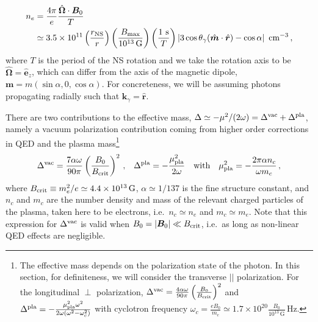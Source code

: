 \documentclass[a4paper,11pt]{article}
\begin{document}
%
\begin{equation}
    \begin{aligned}
   n_{e} & = \frac{4 \pi}{e}\frac{ \hat{\bm{\Omega}} \cdot \bm{B}_{0} }{  T} \\
   & \simeq 3.5 \times 10^{11} \left( \frac{r_{\rm NS}}{r} \right) \left( \frac{B_{\rm max}}{10^{13} \, \text{G}} \right) \left( \frac{1~\text{s}}{T} \right) \left\vert 3 \cos \theta_{\gamma} (\hat{\bm{m}} \cdot \hat{\bm{r}} ) - \cos \alpha  \right\vert~\text{cm}^{-3} \,,
    \end{aligned}
\end{equation}
%
where $ T $ is the period of the NS rotation and we take the rotation axis to be $ \hat{\bm \Omega} = \hat{\bm{e}}_{z}$, 
which can differ from the axis of the magnetic dipole, $ \bm{m} = m (\sin \alpha, 0, \cos \alpha) $.
%
For concreteness, we will be assuming photons propagating radially such that $\hat{\bm k}_\gamma = \hat{\bm r}$.






%
There are two contributions to the effective mass, $ \Delta \simeq - \mu^{2} / (2\omega) = \Delta^{\rm vac} + \Delta^{\rm pla}$, namely a vacuum polarization contribution  coming from higher order corrections in QED and the plasma mass\footnote{The effective mass depends on the polarization state of the photon. In this section, for definiteness, we will consider the transverse $ || $ polarization. For the longitudinal $\perp $ polarization,  $ \Delta^{\text{vac}} = \frac{4 \alpha \omega}{90\pi} \left( \frac{B_{0}}{B_{\rm crit}} \right)^{2} $ and $ \Delta^{\text{pla}} = - \frac{\mu_{\rm pla}^{2} \omega^{2} }{2 \omega (\omega^{2} - \omega_{c}^{2})} $ with cyclotron frequency $\omega_{c} = \frac{e B_{0}}{m_{e}}  \simeq 1.7 \times 10^{20} \frac{B_{0}}{10^{13} \, \text{G}} \, \text{Hz}$.
}
\begin{align}
    \Delta^{\text{vac}} = 
     \frac{7 \alpha \omega}{90\pi} \left( \frac{B_{0}}{B_{\rm crit}} \right)^{2}  \,, && \Delta^{\text{pla}} = - \frac{ \mu_{\rm pla}^{2} }{2 \omega} \quad \text{with} \quad \mu_{\rm pla}^{2} =  - \frac{ 2 \pi \alpha n_{c}}{ \omega m_{c}}\,,
\end{align}
%
where  $ B_{\rm crit} \equiv m_{e}^{2} / e \simeq 4.4\times 10^{13} \, \text{G} $, $\alpha \simeq 1/137$ is the fine structure constant, and
$ n_{c} $ and $m_{c}$ are the number density and mass of the relevant charged particles of the plasma, taken here to be electrons, i.e.\ $ n_{c} \simeq n_{e} $ and $ m_{c} \simeq m_{e} $. 
%
Note that this expression for $ \Delta^{\rm vac} $ is valid when $ B_{0} = |{\bm B}_0| \ll B_{\rm crit}$, i.e.\ as long as non-linear QED effects are negligible.
\end{document}
